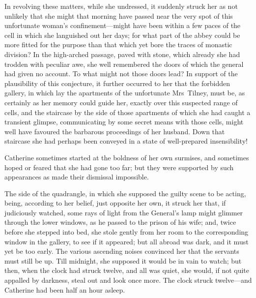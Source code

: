  In revolving these matters, while she undressed, it suddenly struck her as not unlikely that she might that morning have passed near the very spot of this unfortunate woman's confinement—might have been within a few paces of the cell in which she languished out her days; for what part of the abbey could be more fitted for the purpose than that which yet bore the traces of monastic division? In the high-arched passage, paved with stone, which already she had trodden with peculiar awe, she well remembered the doors of which the general had given no account. To what might not those doors lead? In support of the plausibility of this conjecture, it further occurred to her that the forbidden gallery, in which lay the apartments of the unfortunate Mrs~Tilney, must be, as certainly as her memory could guide her, exactly over this suspected range of cells, and the staircase by the side of those apartments of which she had caught a transient glimpse, communicating by some secret means with those cells, might well have favoured the barbarous proceedings of her husband. Down that staircase she had perhaps been conveyed in a state of well-prepared insensibility! 

 Catherine sometimes started at the boldness of her own surmises, and sometimes hoped or feared that she had gone too far; but they were supported by such appearances as made their dismissal impossible. 

 The side of the quadrangle, in which she supposed the guilty scene to be acting, being, according to her belief, just opposite her own, it struck her that, if judiciously watched, some rays of light from the General's lamp might glimmer through the lower windows, as he passed to the prison of his wife; and, twice before she stepped into bed, she stole gently from her room to the corresponding window in the gallery, to see if it appeared; but all abroad was dark, and it must yet be too early. The various ascending noises convinced her that the servants must still be up. Till midnight, she supposed it would be in vain to watch; but then, when the clock had struck twelve, and all was quiet, she would, if not quite appalled by darkness, steal out and look once more. The clock struck twelve—and Catherine had been half an hour asleep. 